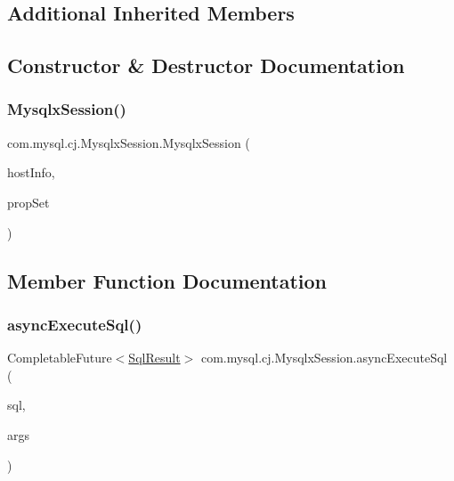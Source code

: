\subsection*{Additional Inherited Members}


\subsection{Constructor \& Destructor Documentation}
\mbox{\label{classcom_1_1mysql_1_1cj_1_1_mysqlx_session_a1a2c1972d8de7a5e18da310e81ba0547}} 
\subsubsection{\texorpdfstring{Mysqlx\+Session()}{MysqlxSession()}}
{\footnotesize\ttfamily com.\+mysql.\+cj.\+Mysqlx\+Session.\+Mysqlx\+Session (\begin{DoxyParamCaption}\item[{\mbox{\hyperlink{classcom_1_1mysql_1_1cj_1_1conf_1_1_host_info}{Host\+Info}}}]{host\+Info,  }\item[{\mbox{\hyperlink{interfacecom_1_1mysql_1_1cj_1_1conf_1_1_property_set}{Property\+Set}}}]{prop\+Set }\end{DoxyParamCaption})}



\subsection{Member Function Documentation}
\mbox{\label{classcom_1_1mysql_1_1cj_1_1_mysqlx_session_a309528046194a468f181727415fddb51}} 
\subsubsection{\texorpdfstring{async\+Execute\+Sql()}{asyncExecuteSql()}}
{\footnotesize\ttfamily Completable\+Future$<$\mbox{\hyperlink{interfacecom_1_1mysql_1_1cj_1_1xdevapi_1_1_sql_result}{Sql\+Result}}$>$ com.\+mysql.\+cj.\+Mysqlx\+Session.\+async\+Execute\+Sql (\begin{DoxyParamCaption}\item[{String}]{sql,  }\item[{List$<$ Object $>$}]{args }\end{DoxyParamCaption})}

